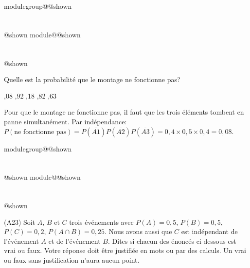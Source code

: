 \documentclass{Evaluation}
\makeatletter
\newcommand{\currentmodulekey}{}
\newcommand{\currentmoduletitle}{}
\newcommand{\currentgroupkey}{}
\newcommand{\currentgrouptitle}{}
\newcommand{\showmoduleifneeded}{%
  \ifx\currentgroupkey\empty\else
    \expandafter\ifx\csname modulegroup@\currentgroupkey @shown\endcsname\relax
      \section*{\currentgrouptitle}%
      \expandafter\gdef\csname modulegroup@\currentgroupkey @shown\endcsname{1}%
    \fi
  \fi
  \expandafter\ifx\csname module@\currentmodulekey @shown\endcsname\relax
    \section*{\currentmoduletitle}%
    \expandafter\gdef\csname module@\currentmodulekey @shown\endcsname{1}%
  \fi
}
\newenvironment{A23}{\showmoduleifneeded}{}
\makeatother
\begin{document}
\begin{questions}
\begin{A23}
 Quelle est la probabilité que le montage ne fonctionne pas? 

 \begin{oneparcheckboxes}
		,08
		,92
		,18 
		,82
		,63
\end{oneparcheckboxes}

\begin{solution}
    Pour que le montage ne fonctionne pas, il faut que les trois éléments tombent en panne simultanément. Par indépendance: $P(\text{ne fonctionne pas})=P(\overline{A1})P(\overline{A2})P(\overline{A3})=0,4\times 0,5\times 0,4=0,08$.
\end{solution}
\end{A23}

\begin{A23}
\question (A23) Soit $A$, $B$ et $C$ trois événements avec $P(A)=0,5$, $P(B)=0,5$, $P(C)=0,2$, $P(A\cap B)=0,25$. Nous avons aussi que $C$ est indépendant de l'événement $A$ et de l'événement $B$. Dites si chacun des énoncés ci-dessous est vrai ou faux. Votre réponse doit être justifiée en mots ou par des calculs. Un vrai ou faux sans justification n'aura aucun point.

\end{A23}
\end{questions}
\end{document}
